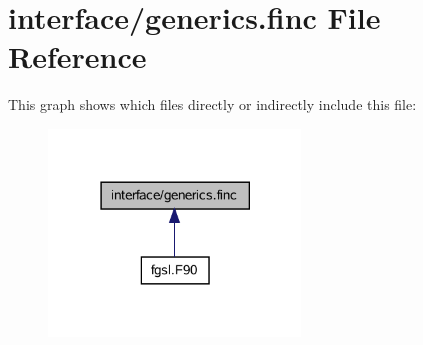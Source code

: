 \hypertarget{generics_8finc}{}\section{interface/generics.finc File Reference}
\label{generics_8finc}
This graph shows which files directly or indirectly include this file\+:\nopagebreak
\begin{figure}[H]
\begin{center}
\leavevmode
\includegraphics[width=190pt]{generics_8finc__dep__incl}
\end{center}
\end{figure}
